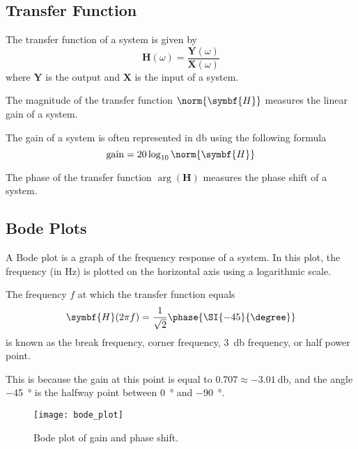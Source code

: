 \documentclass{article}
\begin{document}
\subsection{Transfer Function}
\begin{definition}
    The transfer function of a system is given by
    \begin{equation*}
        \symbf{H}(\omega) = \frac{\symbf{Y}(\omega)}{\symbf{X}(\omega)}
    \end{equation*}
    where $\symbf{Y}$ is the output and $\symbf{X}$ is the input of a system.
\end{definition}
\begin{definition}
    The magnitude of the transfer function $\norm{\symbf{H}}$ measures the linear gain of a system.
\end{definition}
\begin{definition}
    The gain of a system is often represented in \si{\decibel} using the following formula
    \begin{equation*}
        \mathrm{gain} = 20 \log_{10}{\norm{\symbf{H}}}
    \end{equation*}
\end{definition}
\begin{definition}
    The phase of the transfer function $\arg{\left( \symbf{H} \right)}$ measures the phase shift of a system.
\end{definition}
\subsection{Bode Plots}
A Bode plot is a graph of the frequency response of a system.
In this plot, the frequency (in \si{\hertz}) is plotted on the horizontal axis using a logarithmic scale.
\begin{definition}
    The frequency $f$ at which the transfer function equals
    \begin{equation*}
        \symbf{H}(2\pi f) = \frac{1}{\sqrt{2}}\phase{\SI{-45}{\degree}}
    \end{equation*}
    is known as the break frequency, corner frequency,
    \SI{3}{\decibel} frequency, or half power point.

    This is because the gain at this point is equal to $\SI{0.707} \approx \SI{-3.01}{\decibel}$,
    and the angle \SI{-45}{\degree} is the halfway point between \SI{0}{\degree} and \SI{-90}{\degree}.
\end{definition}
\begin{figure}[H]
    \centering
    \texttt{[image: bode\_plot]}
    \caption{Bode plot of gain and phase shift.}
\end{figure}
\newpage
\end{document}
